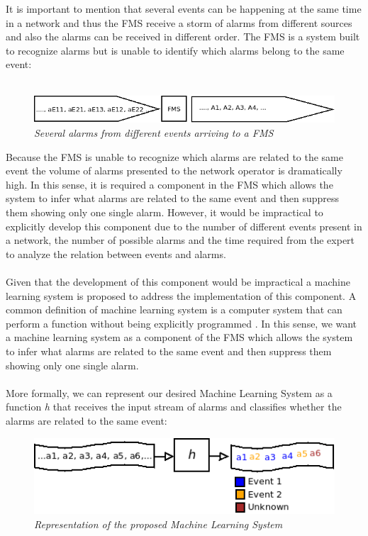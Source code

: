\documentclass[10pt,a4paper]{article}
\begin{document}
It is important to mention that several events can be happening at the same time in a network and thus the FMS receive a storm of alarms from different sources and also the alarms can be received in different order. The FMS is a system built to recognize alarms but is unable to identify which alarms belong to the same event:
\\\\
\begin{figure}[H]
 \includegraphics[scale=0.4]{NMS_FMS_EVENTS.png}
  \centering
  \caption{\textit{Several alarms from different events arriving to a FMS}}
  \label{fig:nms_fms_events}
\end{figure}	

Because the FMS is unable to recognize which alarms are related to the same event the volume of alarms presented to the network operator is dramatically high. In this sense, it is required a component in the FMS which allows the system to infer what alarms are related to the same event and then suppress them showing only one single alarm. However, it would be impractical to explicitly develop this component due to the number of different events present in a network, the number of possible alarms and the time required from the expert to analyze the relation between events and alarms.
\\\\
Given that the development of this component would be impractical a machine learning system is proposed to address the implementation of this component. A common definition of machine learning system is a computer system that can perform a function without being explicitly programmed \cite{netsnmp}. In this sense, we want a machine learning system as a component of the FMS which allows the system to infer what alarms are related to the same event and then suppress them showing only one single alarm. 
\\\\
More formally, we can represent our desired Machine Learning System as a function \textit{h} that receives the input stream of alarms and classifies whether the alarms are related to the same event:

\begin{figure}[H]
 \includegraphics[scale=0.4]{MLS_hypothesis.png}
  \centering
  \caption{\textit{Representation of the proposed Machine Learning System}}
  \label{fig:mls_hypothesis}
\end{figure}	
\end{document}
